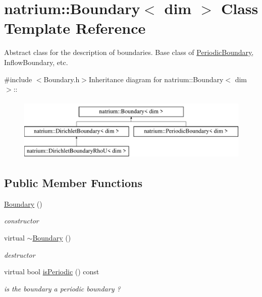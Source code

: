 \hypertarget{classnatrium_1_1Boundary}{
\section{natrium::Boundary$<$ dim $>$ Class Template Reference}
\label{classnatrium_1_1Boundary}
}


Abstract class for the description of boundaries. Base class of \hyperlink{classnatrium_1_1PeriodicBoundary}{PeriodicBoundary}, InflowBoundary, etc.  


{\ttfamily \#include $<$Boundary.h$>$}Inheritance diagram for natrium::Boundary$<$ dim $>$::\begin{figure}[H]
\begin{center}
\leavevmode
\includegraphics[height=3cm]{classnatrium_1_1Boundary}
\end{center}
\end{figure}
\subsection*{Public Member Functions}
\begin{DoxyCompactItemize}
\item 
\hypertarget{classnatrium_1_1Boundary_a987978143b16ef0bbadd2b465dc1882d}{
\hyperlink{classnatrium_1_1Boundary_a987978143b16ef0bbadd2b465dc1882d}{Boundary} ()}
\label{classnatrium_1_1Boundary_a987978143b16ef0bbadd2b465dc1882d}

\begin{DoxyCompactList}\small\item\em constructor \item\end{DoxyCompactList}\item 
\hypertarget{classnatrium_1_1Boundary_a63e8fb8ec44288b9145f819b515ae6d9}{
virtual \hyperlink{classnatrium_1_1Boundary_a63e8fb8ec44288b9145f819b515ae6d9}{$\sim$Boundary} ()}
\label{classnatrium_1_1Boundary_a63e8fb8ec44288b9145f819b515ae6d9}

\begin{DoxyCompactList}\small\item\em destructor \item\end{DoxyCompactList}\item 
\hypertarget{classnatrium_1_1Boundary_acb651f4148b4e00f08258e1321c43235}{
virtual bool \hyperlink{classnatrium_1_1Boundary_acb651f4148b4e00f08258e1321c43235}{isPeriodic} () const }
\label{classnatrium_1_1Boundary_acb651f4148b4e00f08258e1321c43235}

\begin{DoxyCompactList}\small\item\em is the boundary a periodic boundary ? \item\end{DoxyCompactList}\end{DoxyCompactItemize}


